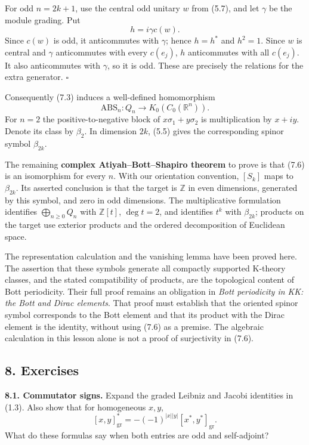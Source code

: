 \documentclass[
  11pt,
]{article}
\begin{document}
For odd \(n=2k+1\), use the central odd unitary \(w\) from (5.7), and
let \(\gamma\) be the module grading. Put \[
h=i\gamma c(w).
\tag{7.5}
\] Since \(c(w)\) is odd, it anticommutes with \(\gamma\); hence
\(h=h^*\) and \(h^2=1\). Since \(w\) is central and \(\gamma\)
anticommutes with every \(c(e_j)\), \(h\) anticommutes with all
\(c(e_j)\). It also anticommutes with \(\gamma\), so it is odd. These
are precisely the relations for the extra generator. \(\square\)

Consequently (7.3) induces a well-defined homomorphism \[
\mathrm{ABS}_n:Q_n\longrightarrow K_0(C_0(\mathbb R^n)).
\tag{7.6}
\] For \(n=2\) the positive-to-negative block of \(x\sigma_1+y\sigma_2\)
is multiplication by \(x+iy\). Denote its class by \(\beta_2\). In
dimension \(2k\), (5.5) gives the corresponding spinor symbol
\(\beta_{2k}\).

The remaining \textbf{complex Atiyah--Bott--Shapiro theorem} to prove is
that (7.6) is an isomorphism for every \(n\). With our orientation
convention, \([S_k]\) maps to \(\beta_{2k}\). Its asserted conclusion is
that the target is \(\mathbb Z\) in even dimensions, generated by this
symbol, and zero in odd dimensions. The multiplicative formulation
identifies \(\bigoplus_{n\geq0}Q_n\) with \(\mathbb Z[t]\),
\(\deg t=2\), and identifies \(t^k\) with \(\beta_{2k}\); products on
the target use exterior products and the ordered decomposition of
Euclidean space.

The representation calculation and the vanishing lemma have been proved
here. The assertion that these symbols generate all compactly supported
K-theory classes, and the stated compatibility of products, are the
topological content of Bott periodicity. Their full proof remains an
obligation in \emph{Bott periodicity in KK: the Bott and Dirac
elements}. That proof must establish that the oriented spinor symbol
corresponds to the Bott element and that its product with the Dirac
element is the identity, without using (7.6) as a premise. The algebraic
calculation in this lesson alone is not a proof of surjectivity in
(7.6).

\subsection{8. Exercises}\label{exercises}

\textbf{8.1. Commutator signs.} Expand the graded Leibniz and Jacobi
identities in (1.3). Also show that for homogeneous \(x,y\), \[
\left[x,y\right]_{\mathrm{gr}}^*
=-(-1)^{|x||y|}[x^*,y^*]_{\mathrm{gr}}.
\] What do these formulas say when both entries are odd and
self-adjoint?
\end{document}
